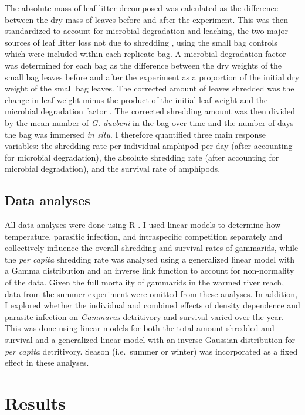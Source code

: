 The absolute mass of leaf litter decomposed was calculated as the difference between the dry mass of leaves before and after the experiment. This was then standardized to account for microbial degradation and leaching, the two major sources of leaf litter loss not due to shredding \citep{cummins1979}, using the small bag controls which were included within each replicate bag. A microbial degradation factor was determined for each bag as the difference between the dry weights of the small bag leaves before and after the experiment as a proportion of the initial dry weight of the small bag leaves. The corrected amount of leaves shredded was the change in leaf weight minus the product of the initial leaf weight and the microbial degradation factor \citep{benfield2006}. The corrected shredding amount was then divided by the mean number of \emph{G. duebeni} in the bag over time and the number of days the bag was immersed \emph{in situ}. I therefore quantified three main response variables: the shredding rate per individual amphipod per day (after accounting for microbial degradation), the absolute shredding rate (after accounting for microbial degradation), and the survival rate of amphipods.

\subsection{ Data analyses}

All data analyses were done using R \citep{r2017}. I used linear models to determine how temperature, parasitic infection, and intraspecific competition separately and collectively influence the overall shredding and survival rates of gammarids, while the \emph{per capita} shredding rate was analysed using a generalized linear model with a Gamma distribution and an inverse link function to account for non-normality of the data. Given the full mortality of gammarids in the warmed river reach, data from the summer experiment were omitted from these analyses. In addition, I explored whether the individual and combined effects of density dependence and parasite infection on \emph{Gammarus} detritivory and survival varied over the year. This was done using linear models for both the total amount shredded and survival and a generalized linear model with an inverse Gaussian distribution for \emph{per capita} detritivory. Season (i.e.\ summer or winter) was incorporated as a fixed effect in these analyses. 


\section{Results}

